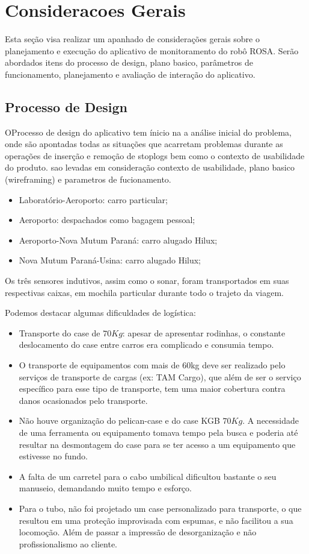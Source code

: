 \section{Consideracoes Gerais}
Esta seção visa realizar um apanhado de considerações gerais sobre o
planejamento e execução do aplicativo de monitoramento do robô ROSA. Serão
abordados itens do processo de design, plano basico,
parâmetros de funcionamento, planejamento e avaliação de interação do
aplicativo.

\subsection{Processo de Design}
OProcesso de design do aplicativo tem ínicio na a análise inicial do
problema, onde são apontadas todas as situações que acarretam pro\-ble\-mas
durante as opera\-ções de inserção e remoção de stoplogs bem como o contexto de
usabilidade do produto. sao levadas em consideração
contexto de usabilidade, plano basico (wireframing) e parametros de fucionamento.

\begin{itemize}
  \item Laboratório-Aeroporto: carro particular;
  \item Aeroporto: despachados como bagagem pessoal;
  \item Aeroporto-Nova Mutum Paraná: carro alugado Hilux;
  \item Nova Mutum Paraná-Usina: carro alugado Hilux;
\end{itemize} 

Os três sensores indutivos, assim como o sonar, foram transportados em suas
respectivas caixas, em mochila particular durante todo o trajeto da viagem.


Podemos destacar algumas dificuldades de logística:
\begin{itemize}
  \item Transporte do case de $70 Kg$: apesar de apresentar rodinhas, o
  constante deslocamento do case entre carros era complicado e consumia tempo.
  \item O transporte de equipamentos com mais de 60kg deve ser realizado pelo
  serviços de transporte de cargas (ex: TAM Cargo), que além de ser o serviço
  específico para esse tipo de transporte, tem uma maior cobertura contra danos ocasionados pelo
  transporte.
  \item Não houve organização do pelican-case e do case KGB $70 Kg$. A
  necessidade de uma ferramenta ou equipamento tomava tempo pela busca e poderia
  até resultar na desmontagem do case para se ter acesso a um equipamento que
  estivesse no fundo.
  \item A falta de um carretel para o cabo umbilical dificultou bastante o seu
  manuseio, demandando muito tempo e esforço.
  \item Para o tubo, não foi projetado um case personalizado para transporte, o
  que resultou em uma proteção improvisada com espumas, e não facilitou a sua
  locomoção. Além de passar a impressão de desorganização e não profissionalismo
  ao cliente.

\end{itemize} 

